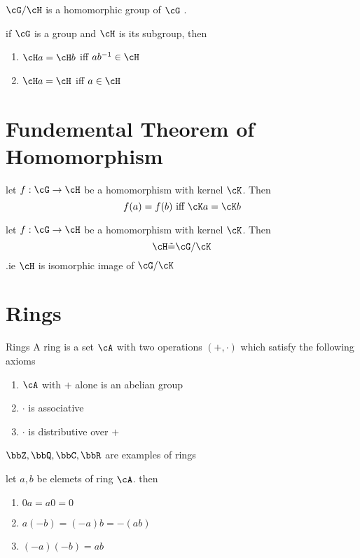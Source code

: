 \documentclass[11pt, oneside, dvipdfmx]{book}
\begin{document}
\begin{MyTheorem}
$\cG / \cH$ is a homomorphic group of $\cG$ . 
\end{MyTheorem}

\begin{MyTheorem}
if $\cG$ is a group and $\cH$ is its subgroup, then
\begin{enumerate}
\item $\cH a = \cH b$ iff $ab^{-1} \in \cH$
\item $\cH a = \cH $ iff $a \in \cH$
\end{enumerate}
\end{MyTheorem}
\section{Fundemental Theorem of Homomorphism}

\begin{MyTheorem}
let $f: \cG \rightarrow \cH$ be a homomorphism with kernel $\cK$. Then
$$ f(a)=f(b) ~\text{iff}~ \cK a =\cK b$$
\end{MyTheorem}


\begin{MyTheorem}
let $f: \cG \rightarrow \cH$ be a homomorphism with kernel $\cK$. Then
$$ \cH \tilde = \cG / \cK$$ .ie $\cH$ is isomorphic image of $\cG / \cK$
\end{MyTheorem}

\section{Rings}

\begin{MyDefinition}{Rings}
A ring is a set $\cA$ with two operations $(+, \cdot)$ which satisfy the following axioms
\begin{enumerate}
\item $\cA$ with $+$ alone is an abelian group
\item $\cdot$ is associative 
\item $\cdot$ is distributive over $+$
\end{enumerate}
\end{MyDefinition}

\begin{description}
\item $\bbZ, \bbQ,\bbC, \bbR$ are examples of rings
\end{description}

\begin{MyTheorem}
let $a,b$ be elemets of ring $\cA$. then
 \begin{enumerate}
\item $0a =a0 =0$ 
\item $a(-b)=(-a)b =-(ab)$ 
\item $(-a)(-b)=ab$
\end{enumerate}
\end{MyTheorem}
\end{document}
